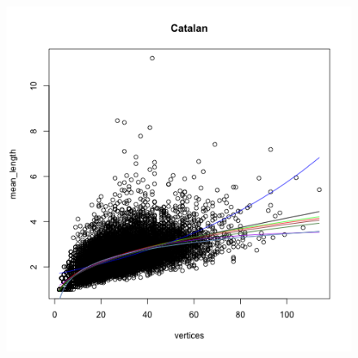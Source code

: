 \documentclass[paper=a4, fontsize=11pt]{scrartcl} %
\begin{document}
\begin{figure}
\begin{minipage}{.5\textwidth}
  \label{fig:10}
\end{minipage}
\end{figure}

\begin{figure}
\centering
\begin{minipage}{\textwidth}
\centering
\begin{minipage}{.5\textwidth}
  \centering
  \includegraphics[width=\linewidth]{Mean_Catalan1}
  \label{fig:cat1}
\end{minipage}%
\begin{minipage}{.5\textwidth}
  \centering

\end{minipage}
\end{minipage}
\end{figure}
\end{document}
